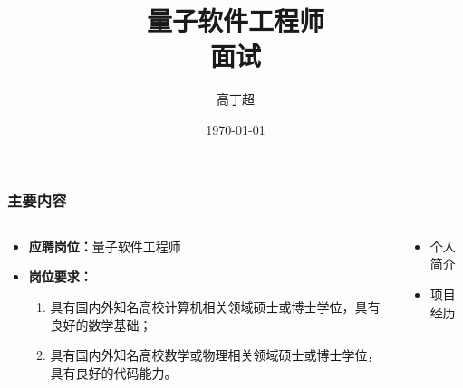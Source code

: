 \documentclass[aspectratio=1610]{beamer}
\title{量子软件工程师\\面试}
\author{高丁超}
\date{\today}
\begin{document}
\frame{\titlepage}
\begin{frame}
    \frametitle{主要内容}
    \begin{columns}
        \begin{column}{.5\textwidth}
            \begin{itemize}
                \item \textbf{应聘岗位：}量子软件工程师
                \item \textbf{岗位要求：}
                \begin{enumerate}
                    \item 具有国内外知名高校计算机相关领域硕士或博士学位，具有良好的数学基础；
                    \item 具有国内外知名高校数学或物理相关领域硕士或博士学位，具有良好的代码能力。
                \end{enumerate}
            \end{itemize}
        \end{column}
        \begin{column}{.4\textwidth}
            \begin{itemize}
                \setlength{\itemsep}{20pt}
                \item 个人简介
                \item 项目经历
            \end{itemize}
        \end{column}
    \end{columns}
\end{frame}
\end{document}
